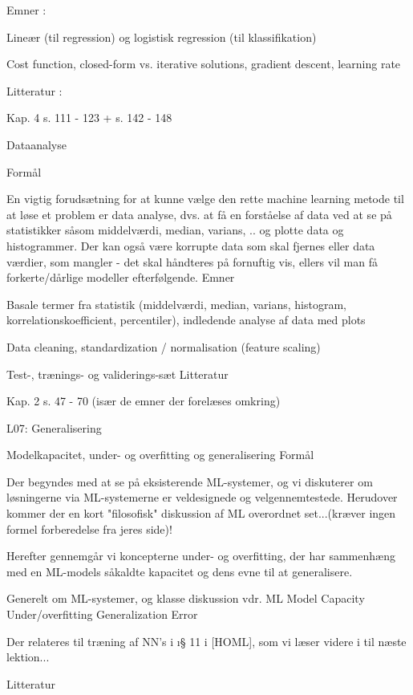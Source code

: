 Emner :

Lineær (til regression) og logistisk regression (til klassifikation)

Cost function, closed-form vs.  iterative solutions, gradient descent, learning
rate


Litteratur :

Kap. 4  s. 111 - 123 + s. 142 - 148



Dataanalyse

Formål

En vigtig forudsætning for at kunne vælge den rette machine learning metode til at løse et problem er data analyse, dvs. at få en forståelse af data ved at se på statistikker såsom middelværdi, median, varians, .. og plotte data og histogrammer. Der kan også være korrupte data som skal fjernes eller data værdier, som mangler - det skal håndteres på fornuftig vis, ellers vil man få forkerte/dårlige modeller efterfølgende.
Emner

Basale termer fra statistik (middelværdi, median, varians, histogram, korrelationskoefficient, percentiler), indledende analyse af data med plots

Data cleaning, standardization / normalisation (feature scaling)

Test-, trænings- og validerings-sæt
Litteratur

Kap. 2  s. 47 - 70 (især de emner der forelæses omkring) 





L07: Generalisering 

Modelkapacitet, under- og overfitting og generalisering
Formål

Der begyndes med at se på eksisterende ML-systemer, og vi diskuterer om
løsningerne via ML-systemerne er veldesignede og velgennemtestede.  Herudover
kommer der en kort "filosofisk" diskussion af ML overordnet set...(kræver ingen
formel forberedelse fra jeres side)!

Herefter gennemgår vi koncepterne under- og overfitting, der har sammenhæng med
en ML-models såkaldte kapacitet og dens evne til at generalisere.

    Generelt om ML-systemer, og klasse diskussion vdr. ML
    Model Capacity
    Under/overfitting
    Generalization Error

Der relateres til træning af NN's i \i{§ 11} i [HOML], som vi læser videre i til
næste lektion...  

Litteratur


